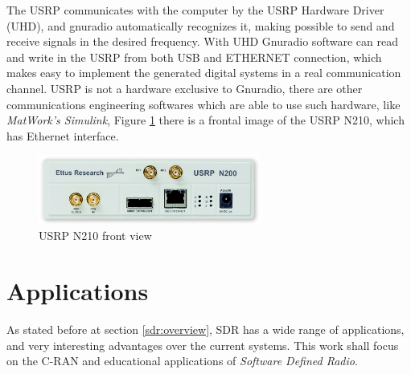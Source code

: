 The USRP communicates with the computer by the USRP Hardware Driver (UHD), and
gnuradio automatically recognizes it, making possible to send and receive
signals in the desired frequency. With UHD Gnuradio software can read and write
in the USRP from both USB and ETHERNET connection, which makes easy to implement
the generated digital systems in a real communication channel. USRP is not a
hardware exclusive to Gnuradio, there are other communications engineering
softwares which are able to use such hardware, like \textit{MatWork's Simulink},
Figure \ref{fig:usrp} there is a frontal image of the USRP N210, which has
Ethernet interface.

\begin{figure}[htbp]
    \centering
    \includegraphics[width=0.65\textwidth]{./figures/usrp}
    \caption{ USRP N210 front view
    \label{fig:usrp}}
\end{figure}

\section{Applications}
\label{sec:sdr_app}

As stated before  at section \ref{sdr:overview}, SDR has a wide range of applications,
and very interesting advantages over the current systems. This work shall focus
on the C-RAN and educational applications of \emph{Software Defined Radio}.


